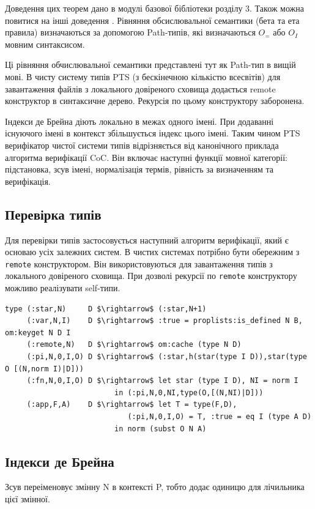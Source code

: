 Доведення цих теорем дано в модулі базової бібліотеки розділу 3.
Також можна повитися на інші доведення \cite{Henk93}.
Рівняння обсислювальної семантики (бета та ета правила) визначаються
за допомогою Path-типів, які визначаються $O_=$ або $O_I$ мовним синтаксисом.

Ці рівняння обчислювальної семантики представлені тут як Path-тип в вищій мові.
В чисту систему типів PTS (з бескінечною кількістю всесвітів)
для завантаження файлів з локального довіреного сховища додається
remote конструктор в синтаксичне дерево. Рекурсія по цьому конструктору заборонена.

Індекси де Брейна діють локально в межах одного імені.
При додаванні існуючого імені в контекст збільшується індекс цього імені.
Таким чином PTS верифікатор чистої системи типів відрізняється від
канонічного приклада алгоритма верифікації CoC\cite{Coq88}. Він включає
наступні функції мовної категорії: підстановка,
зсув імені, нормалізація термів, рівність
за визначенням та верифікація.

\subsection{Перевірка типів}

Для перевірки типів застосовується наступний алгоритм верифікації, який є основаю
усіх залежних систем. В чистих системах потрібно бути обережним з \lstinline{remote}
конструктором. Він використовуються для завантаження типів з локального довіреного сховища.
При дозволі рекурсії по \lstinline{remote} конструктору можливо реалізувати
self-типи\cite{Stump17}\cite{Fu14}.

\begin{lstlisting}[mathescape=true]
type (:star,N)     D $\rightarrow$ (:star,N+1)
     (:var,N,I)    D $\rightarrow$ :true = proplists:is_defined N B, om:keyget N D I
     (:remote,N)   D $\rightarrow$ om:cache (type N D)
     (:pi,N,0,I,O) D $\rightarrow$ (:star,h(star(type I D)),star(type O [(N,norm I)|D]))
     (:fn,N,0,I,O) D $\rightarrow$ let star (type I D), NI = norm I
                         in (:pi,N,0,NI,type(O,[(N,NI)|D]))
     (:app,F,A)    D $\rightarrow$ let T = type(F,D),
                            (:pi,N,0,I,O) = T, :true = eq I (type A D)
                         in norm (subst O N A)
\end{lstlisting}

\subsection{Індекси де Брейна}
Зсув переіменовує змінну N в контексті P, тобто додає одиницю для лічильника цієї змінної.

